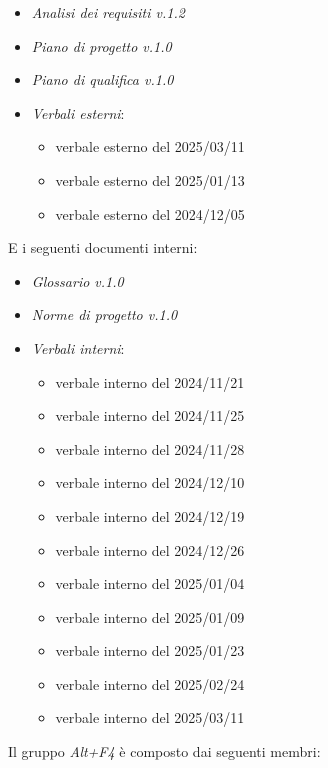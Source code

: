 \documentclass[a4paper, 12pt]{article}
\begin{document}
\begin{itemize}
    \item \textit{Analisi dei requisiti v.1.2}
    \item \textit{Piano di progetto v.1.0}
    \item \textit{Piano di qualifica v.1.0}
    \item \textit{Verbali esterni}:
    \begin{itemize}
        \item verbale esterno del 2025/03/11
        \item verbale esterno del 2025/01/13
        \item verbale esterno del 2024/12/05
    \end{itemize}
\end{itemize}
\noindent
E i seguenti documenti interni:
\begin{itemize}
    \item \textit{Glossario v.1.0}
    \item \textit{Norme di progetto v.1.0}
    \item \textit{Verbali interni}:
    \begin{itemize}
        \item verbale interno del 2024/11/21
        \item verbale interno del 2024/11/25
        \item verbale interno del 2024/11/28
        \item verbale interno del 2024/12/10
        \item verbale interno del 2024/12/19
        \item verbale interno del 2024/12/26
        \item verbale interno del 2025/01/04
        \item verbale interno del 2025/01/09
        \item verbale interno del 2025/01/23
        \item verbale interno del 2025/02/24
        \item verbale interno del 2025/03/11
    \end{itemize}
\end{itemize}
\vspace{0.75cm} 
\noindent
Il gruppo \textit{Alt+F4} è composto dai seguenti membri:
\end{document}
